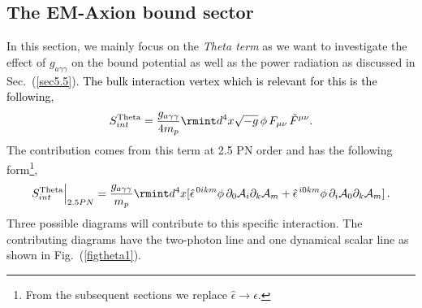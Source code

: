 \subsection{The EM-Axion bound sector}\label{Sec4.2}
In this section, we mainly focus on the \textit{Theta term} as we want to investigate the effect of $g_{a\gamma\gamma}$ on the bound potential as well as the power radiation as discussed in Sec.~(\ref{sec5.5}). \textcolor{black}{The bulk interaction vertex which is relevant for this is the following,
\begin{equation}
    S_{int}^{\text{Theta}}=
\frac{g_{a\gamma\gamma}}{4m_p}\rmint d^4x \sqrt{-g}\,\phi\,F_{\mu\nu}\,\Tilde{F}^{\mu\nu}. 
\end{equation}
}
The contribution comes from this term at 2.5 PN order and has the following form\footnote{From the subsequent sections we replace $\hat\epsilon\rightarrow \epsilon$.},
\begin{equation}
    S_{int}^{\text{Theta}}\Big |_{2.5PN}= \frac{g_{a\gamma\gamma}}{m_p}\rmint d^4x [\hat\epsilon^{\,0ikm}\phi\,\partial_{0}\mathcal{A}_{i}\partial_{k}\mathcal{A}_{m}+ \hat\epsilon^{\,i0km}\phi\,\partial_{i}\mathcal{A}_{0}\partial_{k}\mathcal{A}_{m}]\,.
\end{equation}
 Three possible diagrams will contribute to this specific interaction. The contributing diagrams have the two-photon line and one dynamical scalar line as shown in Fig.~(\ref{figtheta1}).
